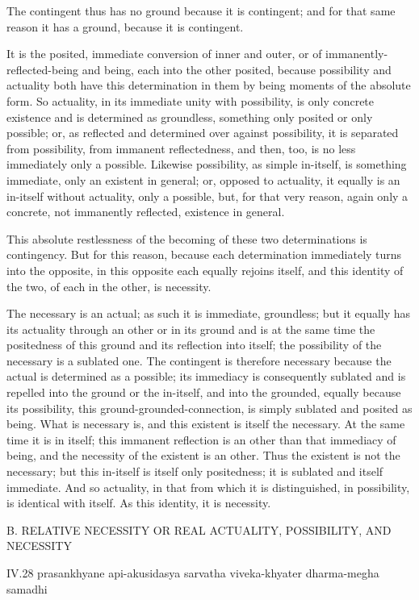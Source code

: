 The contingent thus has no ground because it is contingent;
and for that same reason it has a ground, because it is contingent.

It is the posited, immediate conversion of inner and outer,
or of immanently-reflected-being and being, each into the other posited,
because possibility and actuality both have this determination in them
by being moments of the absolute form.
So actuality, in its immediate unity with possibility,
is only concrete existence and is determined as groundless,
something only posited or only possible;
or, as reflected and determined over against possibility,
it is separated from possibility,
from immanent reflectedness, and then, too, is
no less immediately only a possible.
Likewise possibility, as simple in-itself, is something immediate,
only an existent in general;
or, opposed to actuality, it equally is an in-itself
without actuality, only a possible,
but, for that very reason, again only a concrete,
not immanently reflected, existence in general.

This absolute restlessness of the becoming of
these two determinations is contingency.
But for this reason, because each determination
immediately turns into the opposite,
in this opposite each equally rejoins itself,
and this identity of the two,
of each in the other, is necessity.

The necessary is an actual;
as such it is immediate, groundless;
but it equally has its actuality through an other or in its ground
and is at the same time the positedness of this ground
and its reflection into itself;
the possibility of the necessary is a sublated one.
The contingent is therefore necessary
because the actual is determined as a possible;
its immediacy is consequently sublated
and is repelled into the ground or the in-itself,
and into the grounded, equally because its possibility,
this ground-grounded-connection, is simply sublated and posited as being.
What is necessary is, and this existent is itself the necessary.
At the same time it is in itself;
this immanent reflection is an other than that immediacy of being,
and the necessity of the existent is an other.
Thus the existent is not the necessary;
but this in-itself is itself only positedness;
it is sublated and itself immediate.
And so actuality, in that from which it is distinguished,
in possibility, is identical with itself.
As this identity, it is necessity.

B. RELATIVE NECESSITY OR REAL ACTUALITY, POSSIBILITY, AND NECESSITY

IV.28
prasankhyane api-akusidasya sarvatha viveka-khyater dharma-megha samadhi

